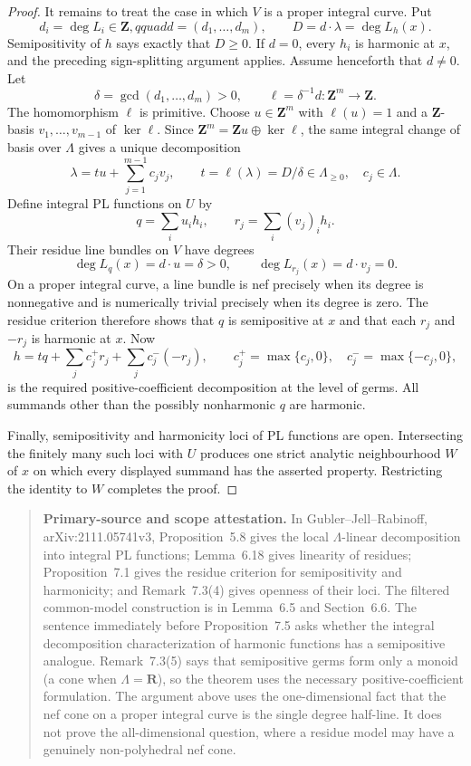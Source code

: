\begin{proof}
It remains to treat the case in which $V$ is a proper integral curve.  Put
\[
                 d_i=\deg L_i\in\mathbf Z,qquad
                 d=(d_1,\ldots,d_m),\qquad
                 D=d\cdot\lambda=\deg L_h(x).
\]
Semipositivity of $h$ says exactly that $D\geq0$.  If $d=0$, every $h_i$
is harmonic at $x$, and the preceding sign-splitting argument applies.
Assume henceforth that $d\ne0$.  Let
\[
                 \delta=\gcd(d_1,\ldots,d_m)>0,
                 \qquad \ell=\delta^{-1}d:\mathbf Z^m\to\mathbf Z.
\]
The homomorphism $\ell$ is primitive.  Choose $u\in\mathbf Z^m$ with
$\ell(u)=1$ and a $\mathbf Z$-basis
$v_1,\ldots,v_{m-1}$ of $\ker\ell$.  Since
$\mathbf Z^m=\mathbf Zu\oplus\ker\ell$, the same integral change of basis
over $\Lambda$ gives a unique decomposition
\[
            \lambda=t u+\sum_{j=1}^{m-1}c_jv_j,
            \qquad
            t=\ell(\lambda)=D/\delta\in\Lambda_{\geq0},
            \quad c_j\in\Lambda.
\]
Define integral PL functions on $U$ by
\[
                    q=\sum_i u_i h_i,
             \qquad r_j=\sum_i(v_j)_i h_i.
\]
Their residue line bundles on $V$ have degrees
\[
              \deg L_q(x)=d\cdot u=\delta>0,
              \qquad \deg L_{r_j}(x)=d\cdot v_j=0.
\]
On a proper integral curve, a line bundle is nef precisely when its degree
is nonnegative and is numerically trivial precisely when its degree is zero.
The residue criterion therefore shows that $q$ is semipositive at $x$ and
that each $r_j$ and $-r_j$ is harmonic at $x$.  Now
\[
 h=tq+\sum_j c_j^+r_j+\sum_j c_j^-(-r_j),
 \qquad
 c_j^+=\max\{c_j,0\},\quad c_j^-=\max\{-c_j,0\},
\]
is the required positive-coefficient decomposition at the level of germs.
All summands other than the possibly nonharmonic $q$ are harmonic.

Finally, semipositivity and harmonicity loci of PL functions are open.
Intersecting the finitely many such loci with $U$ produces one strict
analytic neighbourhood $W$ of $x$ on which every displayed summand has the
asserted property.  Restricting the identity to $W$ completes the proof.
\end{proof}

\begin{quote}
\textbf{Primary-source and scope attestation.}
In Gubler--Jell--Rabinoff, arXiv:2111.05741v3, Proposition~5.8 gives the
local $\Lambda$-linear decomposition into integral PL functions;
Lemma~6.18 gives linearity of residues; Proposition~7.1 gives the residue
criterion for semipositivity and harmonicity; and Remark~7.3(4) gives
openness of their loci.  The filtered common-model construction is in
Lemma~6.5 and Section~6.6.  The sentence immediately before
Proposition~7.5 asks whether the integral decomposition characterization of
harmonic functions has a semipositive analogue.  Remark~7.3(5) says that
semipositive germs form only a monoid (a cone when $\Lambda=\mathbf R$), so
the theorem uses the necessary positive-coefficient formulation.  The
argument above uses the one-dimensional fact that the nef cone on a proper
integral curve is the single degree half-line.  It does not prove the
all-dimensional question, where a residue model may have a genuinely
non-polyhedral nef cone.
\end{quote}
